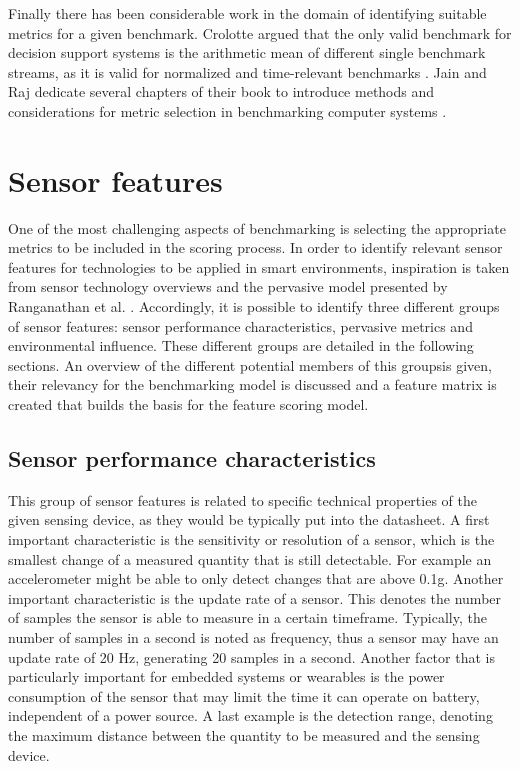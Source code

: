Finally there has been considerable work in the domain of identifying suitable metrics for a given benchmark. Crolotte argued that the only valid benchmark for decision support systems is the arithmetic mean of different single benchmark streams, as it is valid for normalized and time-relevant benchmarks \cite{crolotte2009issues}.  Jain and Raj dedicate several chapters of their book to introduce methods and considerations for metric selection in benchmarking computer systems \cite{jain1991art}. 

\section{Sensor features}
One of the most challenging aspects of benchmarking is selecting the appropriate metrics to be included in the scoring process. In order to identify relevant sensor features for technologies to be applied in smart environments, inspiration is taken from sensor technology overviews \cite{wilson2004sensor} and the pervasive model presented by Ranganathan et al. \cite{ranganathan2005towards}.  Accordingly, it is possible to identify three different groups of sensor features: sensor performance characteristics, pervasive metrics and environmental influence. These different groups are detailed in the following sections. An overview of the different potential members of this groupsis given, their relevancy for the benchmarking model is discussed and a feature matrix is created that builds the basis for the feature scoring model.

\subsection{Sensor performance characteristics}
This group of sensor features is related to specific technical properties of the given sensing device, as they would be typically put into the datasheet. A first important characteristic is the sensitivity or resolution of a sensor, which is the smallest change of a measured quantity that is still detectable. For example an accelerometer might be able to only detect changes that are above 0.1g. Another important characteristic is the update rate of a sensor. This denotes the number of samples the sensor is able to measure in a certain timeframe. Typically, the number of samples in a second is noted as frequency, thus a sensor may have an update rate of 20 Hz, generating 20 samples in a second. Another factor that is particularly important for embedded systems or wearables is the power consumption of the sensor that may limit the time it can operate on battery, independent of a power source. A last example is the detection range, denoting the maximum distance between the quantity to be measured and the sensing device.
